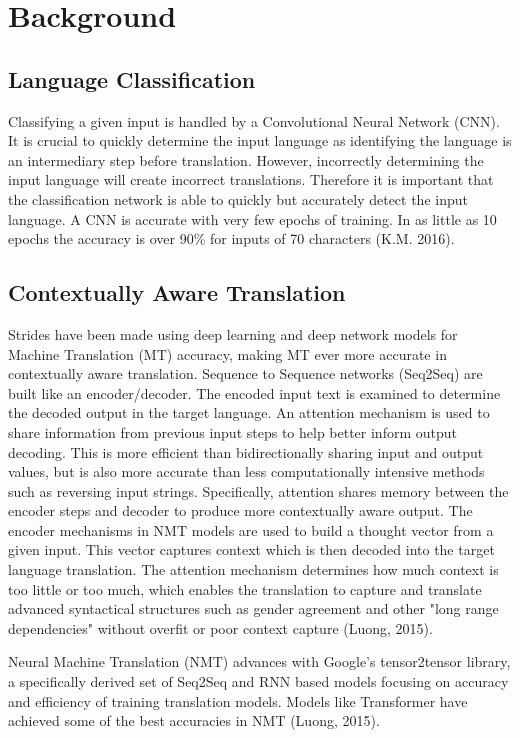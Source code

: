 \documentclass[10pt,a4paper]{article}
\begin{document}
\section{Background}


\subsection{Language Classification}


  Classifying a given input is handled by a Convolutional Neural Network (CNN). It is crucial to quickly determine the input language as identifying the language is an intermediary step before translation. However, incorrectly determining the input language will create incorrect translations. Therefore it is important that the classification network is able to quickly but accurately detect the input language. A CNN is accurate with very few epochs of training. In as little as 10 epochs the accuracy is over 90\% for inputs of 70 characters (K.M. 2016).


\subsection{Contextually Aware Translation}


  Strides have been made using deep learning and deep network models for Machine Translation (MT) accuracy, making MT ever more accurate in contextually aware translation. Sequence to Sequence networks (Seq2Seq) are built like an encoder/decoder. The encoded input text is examined to determine the decoded output in the target language. An attention mechanism is used to share information from previous input steps to help better inform output decoding. This is more efficient than bidirectionally sharing input and output values, but is also more accurate than less computationally intensive methods such as reversing input strings. Specifically, attention shares memory between the encoder steps and decoder to produce more contextually aware output. The encoder mechanisms in NMT models are used to build a thought vector from a given input. This vector captures context which is then decoded into the target language translation. The attention mechanism determines how much context is too little or too much, which enables the translation to capture and translate advanced syntactical structures such as gender agreement and other "long range dependencies" without overfit or poor context capture (Luong, 2015).


  Neural Machine Translation (NMT) advances with Google's tensor2tensor library, a specifically derived set of Seq2Seq and RNN based models focusing on accuracy and efficiency of training translation models. Models like Transformer have achieved some of the best accuracies in NMT (Luong, 2015).
  
\end{document}
